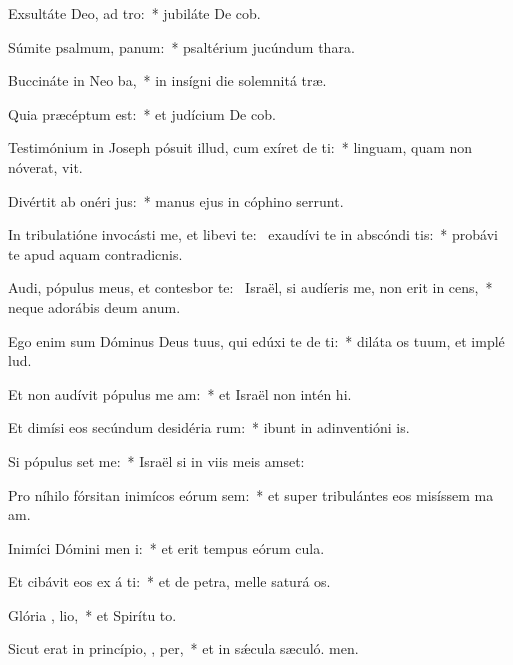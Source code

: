 \item Exsultáte Deo, ad tro:~* jubiláte De cob.
\item Súmite psalmum,   panum:~* psaltérium jucúndum  thara.
\item Buccináte in Neo ba,~* in insígni die solemnitá træ.
\item Quia præcéptum   est:~* et judícium De cob.
\item Testimónium in Joseph pósuit illud, cum exíret de  ti:~* linguam, quam non nóverat, vit.
\item Divértit ab onéri  jus:~* manus ejus in cóphino serrunt.
\item In tribulatióne invocásti me, et libevi te:~\pscross{} exaudívi te in abscóndi tis:~* probávi te apud aquam contradicnis.
\item Audi, pópulus meus, et contesbor te:~\pscross{} Israël, si audíeris me, non erit in   cens,~* neque adorábis deum anum.
\item Ego enim sum Dóminus Deus tuus, qui edúxi te de  ti:~* diláta os tuum, et implé lud.
\item Et non audívit pópulus me  am:~* et Israël non intén hi.
\item Et dimísi eos secúndum desidéria  rum:~* ibunt in adinventióni is.
\item Si pópulus  set me:~* Israël si in viis meis amset:
\item Pro níhilo fórsitan inimícos eórum sem:~* et super tribulántes eos misíssem ma am.
\item Inimíci Dómini men  i:~* et erit tempus eórum  cula.
\item Et cibávit eos ex á ti:~* et de petra, melle saturá os.
\item Glória ,  lio,~* et Spirítu to.
\item Sicut erat in princípio,  ,  per,~* et in sǽcula sæculó. men.
